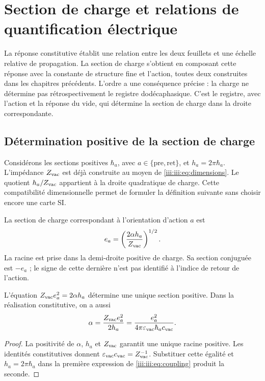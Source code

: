\section{Section de charge et relations de quantification électrique}
\label{iii:iii:sec:carga}

La réponse constitutive établit une relation entre les deux feuillets et une échelle relative de propagation. La section de charge s'obtient en composant cette réponse avec la constante de structure fine et l'action, toutes deux construites dans les chapitres précédents. L'ordre a une conséquence précise : la charge ne détermine pas rétrospectivement le registre dodécaphasique. C'est le registre, avec l'action et la réponse du vide, qui détermine la section de charge dans la droite correspondante.

\subsection{Détermination positive de la section de charge}

Considérons les sections positives $\hbar_a$, avec
$a\in\{\mathrm{pre},\mathrm{ret}\}$, et $h_a=2\pi\hbar_a$.
L’impédance $Z_{\rm vac}$ est déjà construite au moyen de
\eqref{iii:iii:eq:dimensions}. Le quotient $h_a/Z_{\rm vac}$ appartient à
la droite quadratique de charge. Cette compatibilité dimensionnelle permet
de formuler la définition suivante sans choisir encore une carte SI.

\begin{definition}
La section de charge correspondant à l’orientation d’action $a$ est
\begin{equation}
 e_a=\left(\frac{2\alpha h_a}{Z_{\rm vac}}\right)^{1/2}.
 \label{iii:iii:eq:charge}
\end{equation}
La racine est prise dans la demi-droite positive de charge. Sa section conjuguée
est $-e_a$ ; le signe de cette dernière n’est pas identifié à l’indice de
retour de l’action.
\end{definition}

\begin{proposition}
L’équation $Z_{\rm vac}e_a^2=2\alpha h_a$ détermine une unique section
positive. Dans la réalisation constitutive, on a aussi
\begin{equation}
 \alpha=\frac{Z_{\rm vac}e_a^2}{2h_a}
 =\frac{e_a^2}{4\pi\varepsilon_{\rm vac}\hbar_a c_{\rm vac}}.
 \label{iii:iii:eq:coupling}
\end{equation}
\end{proposition}
\begin{proof}
La positivité de $\alpha$, $h_a$ et $Z_{\rm vac}$ garantit une unique racine positive. Les identités constitutives donnent $\varepsilon_{\rm vac}c_{\rm vac}=Z_{\rm vac}^{-1}$. Substituer cette égalité et $h_a=2\pi\hbar_a$ dans la première expression de \eqref{iii:iii:eq:coupling} produit la seconde.
\end{proof}


